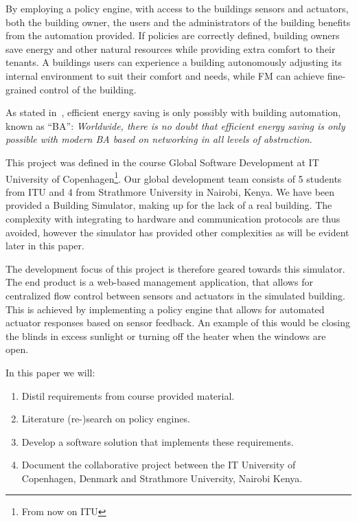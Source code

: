 By employing a policy engine, with access to the buildings sensors and actuators, both the building owner, the users and the administrators of the building benefits from the automation provided. If policies are correctly defined, building owners save energy and other natural resources while providing extra comfort to their tenants. A buildings users can experience a building autonomously adjusting its internal environment to suit their comfort and needs, while FM can achieve fine-grained control of the building.

As stated in~\cite{ba-short}, efficient energy saving is only possibly with building automation, known as ``BA'': \textit{Worldwide, there is no doubt that efficient energy saving is only possible with modern BA based on networking in all levels of abstraction}.

This project was defined in the course Global Software Development at IT University of Copenhagen\footnote{From now on ITU}. Our global development team consists of 5 students from ITU and 4 from Strathmore University in Nairobi, Kenya. We have been provided a Building Simulator, making up for the lack of a real building. The complexity with integrating to hardware and communication protocols are thus avoided, however the simulator has provided other complexities as will be evident later in this paper. 

The development focus of this project is therefore geared towards this simulator. The end product is a web-based management application, that allows for centralized flow control between sensors and actuators in the simulated building. This is achieved by implementing a policy engine that allows for automated actuator responses based on sensor feedback. An example of this would be closing the blinds in excess sunlight or turning off the heater when the windows are open.

In this paper we will: 
\begin{enumerate}
	\item Distil requirements from course provided material.
	\item Literature (re-)search on policy engines.
	\item Develop a software solution that implements these requirements.
	\item Document the collaborative project between the IT University of Copenhagen, Denmark and Strathmore University, Nairobi Kenya.
\end{enumerate}

